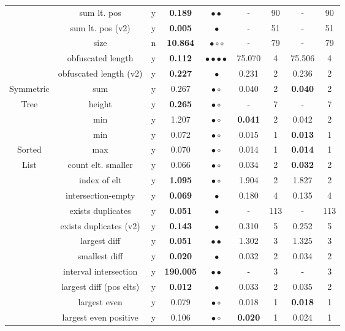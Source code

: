 {\begin{longtable}[h]{|c|c|c|c|c||c|c||c|c|}
        & sum lt. pos & y & {\bf 0.189} & $\bullet\bullet$ & -  & 90 & - & 90 \\ 
        & sum lt. pos (v2) & y & {\bf 0.005} & $\bullet$ & -  & 51 & - & 51 \\ 
        & size & n & {\bf 10.864} & $\bullet\circ\circ$ & -  & 79 & - & 79 \\ 
			\hline
  & obfuscated length & y & {\bf 0.112} & $\bullet\bullet\bullet\bullet$ &  75.070  & 4 &  75.506 & 4 \\ 
  & obfuscated length (v2) & y & {\bf 0.227} & $\bullet$ &  0.231  & 2 &  0.236 & 2 \\ 
			\hline
 Symmetric   & sum & y &  0.267 & $\bullet\circ$ &  0.040  & 2 & {\bf 0.040} & 2 \\ 
    Tree     & height & y & {\bf 0.265} & $\bullet\circ$ & -  & 7 & - & 7 \\ 
             & min & y &  1.207 & $\bullet\circ$ & {\bf 0.041}  & 2 &  0.042 & 2 \\ 
			\hline
         & min  & y &  0.072 & $\bullet\circ$ &  0.015  & 1 & {\bf 0.013} & 1 \\ 
 Sorted  & max  & y &  0.070 & $\bullet\circ$ &  0.014  & 1 & {\bf 0.014} & 1 \\ 
 List    & count elt. smaller  & y &  0.066 & $\bullet\circ$ &  0.034  & 2 & {\bf 0.032} & 2 \\ 
         & index of elt  & y & {\bf 1.095} & $\bullet\circ$ &  1.904  & 2 &  1.827 & 2 \\ 
         & intersection-empty  & y & {\bf 0.069} & $\bullet$ &  0.180  & 4 &  0.135 & 4 \\ 
    & exists duplicates & y & {\bf 0.051} & $\bullet$ & -  & 113 & - & 113 \\ 
    & exists duplicates (v2) & y & {\bf 0.143} & $\bullet$ &  0.310  & 5 &  0.252 & 5 \\ 
         & largest diff  & y & {\bf 0.051} & $\bullet\bullet$ &  1.302  & 3 &  1.325 & 3 \\ 
         & smallest diff  & y & {\bf 0.020} & $\bullet$ &  0.032  & 2 &  0.034 & 2 \\ 
          & interval intersection  & y & {\bf 190.005} & $\bullet\bullet$ & -  & 3 & - & 3 \\ 
         & largest diff (pos elts)  & y & {\bf 0.012} & $\bullet$ &  0.033  & 2 &  0.035 & 2 \\ 
         & largest even & y &  0.079 & $\bullet\circ$ &  0.018  & 1 & {\bf 0.018} & 1 \\ 
         & largest even positive & y &  0.106 & $\bullet\circ$ & {\bf 0.020}  & 1 &  0.024 & 1 \\ 

\end{longtable}}
